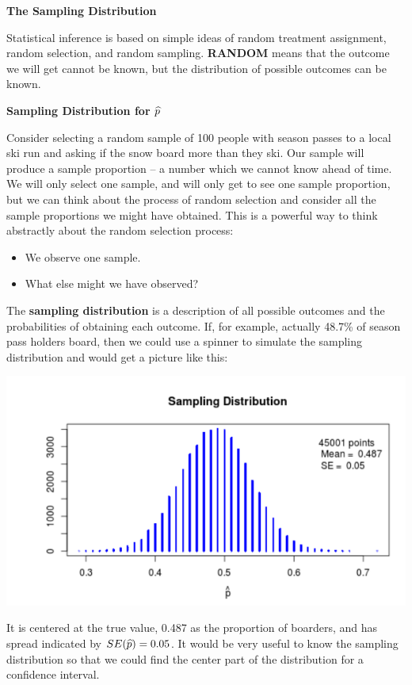 \def\theTopic{Reading 9}

\begin{center}
  {\large \bf The Sampling Distribution}
\end{center}

 Statistical inference is based on simple ideas of random treatment
 assignment, random selection, and random sampling.   {\bf RANDOM} 
 means that the outcome we will get cannot be known, but the
 distribution of possible outcomes can be known. 

\begin{center}
  {\bf Sampling Distribution for $\widehat{p}$}
\end{center}
 Consider selecting a random sample of 100 people with season passes
 to a local ski run and asking if the snow board more than they ski.
 Our sample will produce a sample  proportion -- a number which we
 cannot know ahead of time.  We will only select 
 one sample, and will only get to see one sample proportion, but we
 can think about the process of random selection and consider all the
 sample proportions we might have obtained.  This is a powerful way to
 think abstractly about the random selection process:
 \begin{itemize}
 \item We observe one sample.
 \item What else might we have observed?
 \end{itemize}
  The {\bf sampling distribution} is a description of all possible
  outcomes and the probabilities of obtaining each outcome.  If, for
  example, actually 48.7\%  of season pass holders board, then we
  could use a spinner to simulate the sampling distribution and would
  get a picture like this:

  \includegraphics[width=.5\linewidth]{../plots/SampDistnofPhat-100.png}

It is centered at the true value, 0.487 as the proportion of boarders,
and has spread indicated by $SE(\widehat{p}) = 0.05$. 
It would be very useful to know the sampling distribution so that we
could find the center part of the distribution for a confidence
interval.  

